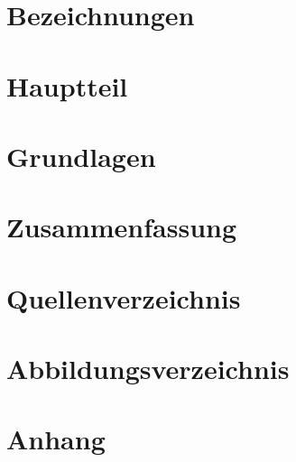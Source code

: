 \documentclass[a4paper,12pt]{article}
\begin{document}



\tableofcontents
\section{Bezeichnungen}

\section{Hauptteil}

\section{Grundlagen}

\section{Zusammenfassung}

\section{Quellenverzeichnis}

\section{Abbildungsverzeichnis}

\section{Anhang}

\end{document}
